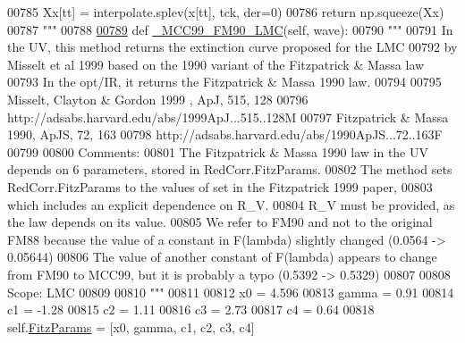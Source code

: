\begin{DoxyCode}
{00785 \textcolor{stringliteral}{            Xx[tt] = interpolate.splev(x[tt], tck, der=0)}
00786 \textcolor{stringliteral}{        return np.squeeze(Xx)}
00787 \textcolor{stringliteral}{        """}    
00788             
\hypertarget{red__corr_8py_source_l00789}{}\hyperlink{classpyneb_1_1extinction_1_1red__corr_1_1_red_corr_a9eacce21ff80a457fc1d285291eed996}{00789}     \textcolor{keyword}{def }\hyperlink{classpyneb_1_1extinction_1_1red__corr_1_1_red_corr_a9eacce21ff80a457fc1d285291eed996}{\_MCC99\_FM90\_LMC}(self, wave):
00790         \textcolor{stringliteral}{"""}
00791 \textcolor{stringliteral}{        In the UV, this method returns the extinction curve proposed for the LMC }
00792 \textcolor{stringliteral}{        by Misselt et al 1999 based on the 1990 variant of the Fitzpatrick & Massa law}
00793 \textcolor{stringliteral}{        In the opt/IR, it returns the Fitzpatrick & Massa 1990 law.}
00794 \textcolor{stringliteral}{}
00795 \textcolor{stringliteral}{        Misselt, Clayton & Gordon 1999 , ApJ, 515, 128 }
00796 \textcolor{stringliteral}{        http://adsabs.harvard.edu/abs/1999ApJ...515..128M}
00797 \textcolor{stringliteral}{        Fitzpatrick & Massa 1990, ApJS, 72, 163}
00798 \textcolor{stringliteral}{        http://adsabs.harvard.edu/abs/1990ApJS...72..163F}
00799 \textcolor{stringliteral}{        }
00800 \textcolor{stringliteral}{        Comments:}
00801 \textcolor{stringliteral}{        The Fitzpatrick & Massa 1990 law in the UV depends on 6 parameters, stored in RedCorr.FitzParams.}
00802 \textcolor{stringliteral}{        The method sets RedCorr.FitzParams to the values of set in the Fitzpatrick 1999 paper, }
00803 \textcolor{stringliteral}{        which includes an explicit dependence on R\_V.}
00804 \textcolor{stringliteral}{        R\_V must be provided, as the law depends on its value.}
00805 \textcolor{stringliteral}{        We refer to FM90 and not to the original FM88 because the value of a constant in F(lambda) slightly
       changed (0.0564 -> 0.05644)}
00806 \textcolor{stringliteral}{        The value of another constant of F(lambda) appears to change from FM90 to MCC99, but it is probably
       a typo (0.5392 -> 0.5329) }
00807 \textcolor{stringliteral}{        }
00808 \textcolor{stringliteral}{        Scope: LMC}
00809 \textcolor{stringliteral}{}
00810 \textcolor{stringliteral}{        """}
00811     
00812         x0 = 4.596  
00813         gamma = 0.91
00814         c1 = -1.28
00815         c2 = 1.11    
00816         c3 = 2.73    
00817         c4 = 0.64    
00818         self.\hyperlink{classpyneb_1_1extinction_1_1red__corr_1_1_red_corr_a133fcc7513d358e629266b24cbe7bebc}{FitzParams} = [x0, gamma, c1, c2, c3, c4]
}
\end{DoxyCode}
